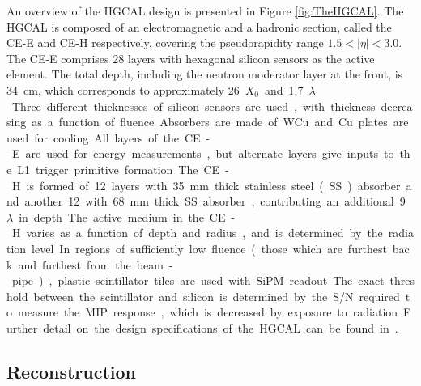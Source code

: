 An overview of the HGCAL design is presented in Figure \ref{fig:TheHGCAL}.
The HGCAL is composed of an electromagnetic and a hadronic section, called the CE-E and CE-H respectively, covering the pseudorapidity range $1.5 < |\eta| < 3.0$.
The CE-E comprises 28 layers with hexagonal silicon sensors as the active element. 
The total depth, including the neutron moderator layer at the front, is \SI{34}{cm}, which corresponds to approximately \SI{26}{$X_0$} and \SI{1.7}{$\lambda$}. 
Three different thicknesses of silicon sensors are used, with thickness decreasing as a function of fluence. 
Absorbers are made of WCu and Cu plates are used for cooling. 
All layers of the CE-E are used for energy measurements, but alternate layers give inputs to the L1 trigger primitive formation. 

The CE-H is formed of 12 layers with \SI{35}{mm} thick stainless steel (SS) absorber and another 12 with \SI{68}{mm} thick SS absorber, contributing an additional \SI{9}{$\lambda$} in depth. 
The active medium in the CE-H varies as a function of depth and radius, and is determined by the radiation level. 
In regions of sufficiently low fluence (those which are furthest back and furthest from the beam-pipe), plastic scintillator tiles are used with SiPM readout. 
The exact threshold between the scintillator and silicon is determined by the S/N required to measure the MIP response, which is decreased by exposure to radiation. 
Further detail on the design specifications of the HGCAL can be found in \cite{HGCAL}. 

\subsection{Reconstruction}

